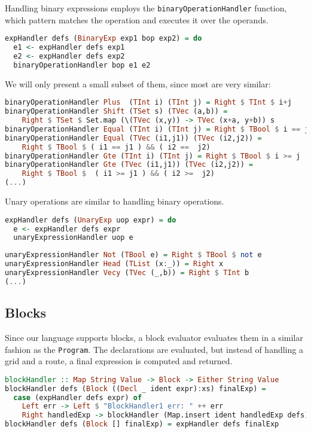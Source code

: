Handling binary expressions employs the \lstinline{binaryOperationHandler} function, which pattern matches the operation and executes it over the operands.
\begin{lstlisting}[caption={},language=haskell]
expHandler defs (BinaryExp exp1 bop exp2) = do
  e1 <- expHandler defs exp1
  e2 <- expHandler defs exp2
  binaryOperationHandler bop e1 e2
\end{lstlisting}

We will only present a small subset of them, since most are very similar:
\begin{lstlisting}[caption={},language=haskell]
binaryOperationHandler Plus  (TInt i) (TInt j) = Right $ TInt $ i+j
binaryOperationHandler Shift (TSet s) (TVec (a,b)) = 
    Right $ TSet $ Set.map (\(TVec (x,y)) -> TVec (x+a, y+b)) s
binaryOperationHandler Equal (TInt i) (TInt j) = Right $ TBool $ i == j
binaryOperationHandler Equal (TVec (i1,j1)) (TVec (i2,j2)) = 
    Right $ TBool $ ( i1 == j1 ) && ( i2 ==  j2)
binaryOperationHandler Gte (TInt i) (TInt j) = Right $ TBool $ i >= j
binaryOperationHandler Gte (TVec (i1,j1)) (TVec (i2,j2)) = 
    Right $ TBool $  ( i1 >= j1 ) && ( i2 >=  j2)
(...)
\end{lstlisting}

Unary operations are similar to handling binary operations.
\begin{lstlisting}[caption={},language=haskell]
expHandler defs (UnaryExp uop expr) = do
  e <- expHandler defs expr
  unaryExpressionHandler uop e
\end{lstlisting}


\begin{lstlisting}[caption={},language=haskell]
unaryExpressionHandler Not (TBool e) = Right $ TBool $ not e
unaryExpressionHandler Head (TList (x:_)) = Right x
unaryExpressionHandler Vecy (TVec (_,b)) = Right $ TInt b
(...)
\end{lstlisting}


\subsection{Blocks}

Since our language supports blocks, a block evaluator evaluates them in a similar fashion as the \lstinline{Program}. The declarations are evaluated, but instead of handling a grid and a route, a final expression is computed and returned.
\begin{lstlisting}[caption={},language=haskell]
blockHandler :: Map String Value -> Block -> Either String Value
blockHandler defs (Block ((Decl _ ident expr):xs) finalExp) =
  case (expHandler defs expr) of
    Left err -> Left $ "BlockHandler1 err: " ++ err
    Right handledExp -> blockHandler (Map.insert ident handledExp defs) (Block xs finalExp)
blockHandler defs (Block [] finalExp) = expHandler defs finalExp
\end{lstlisting}


